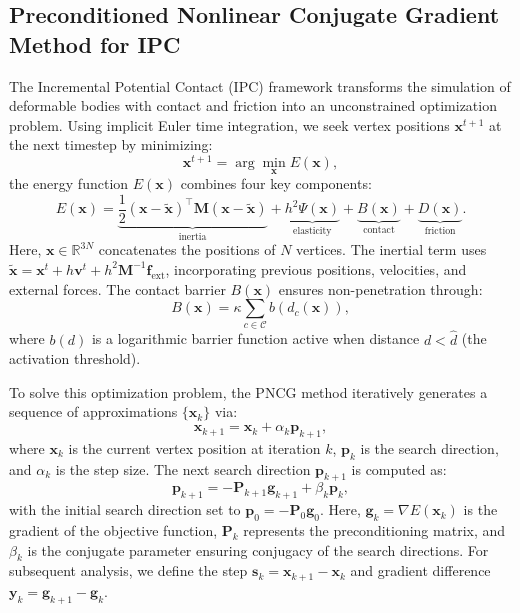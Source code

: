 \documentclass[acmtog,anonymous,review,screen,nonacm]{acmart}
\begin{document}
\subsection{Preconditioned Nonlinear Conjugate Gradient Method for IPC}
\label{sec:pncg_method}
The Incremental Potential Contact (IPC) framework transforms the simulation of deformable bodies with contact and friction into an unconstrained optimization problem. Using implicit Euler time integration, we seek vertex positions $\mathbf{x}^{t+1}$ at the next timestep by minimizing:
\begin{equation}
    \mathbf{x}^{t+1} = \arg \min _{\mathbf{x}} E(\mathbf{x}),
\end{equation}
the energy function $E(\mathbf{x})$ combines four key components:
\begin{equation}
    E(\mathbf{x}) = \underbrace{\frac{1}{2}(\mathbf{x}-\tilde{\mathbf{x}})^{\top} \mathbf{M}(\mathbf{x}-\tilde{\mathbf{x}})}_{\text{inertia}} + \underbrace{h^2 \Psi(\mathbf{x})}_{\text{elasticity}} + \underbrace{B(\mathbf{x})}_{\text{contact}} + \underbrace{D(\mathbf{x})}_{\text{friction}}.
    \label{eq:ipc_energy}
\end{equation}
Here, $\mathbf{x} \in \mathbb{R}^{3N}$ concatenates the positions of $N$ vertices. The inertial term uses $\tilde{\mathbf{x}} = \mathbf{x}^{t} + h\mathbf{v}^{t} + h^2\mathbf{M}^{-1}\mathbf{f}_{\text{ext}}$, incorporating previous positions, velocities, and external forces. The contact barrier $B(\mathbf{x})$ ensures non-penetration through:
\begin{equation}
    B(\mathbf{x}) = \kappa \sum_{c \in \mathcal{C}} b(d_c(\mathbf{x})),
\end{equation}
where $b(d)$ is a logarithmic barrier function active when distance $d < \hat{d}$ (the activation threshold).

To solve this optimization problem, the PNCG method \cite{shen2024preconditioned} iteratively generates a sequence of approximations $\{\mathbf{x}_k\}$ via:
\begin{equation}
    \mathbf{x}_{k+1} = \mathbf{x}_k + \alpha_k \mathbf{p}_{k+1},
\end{equation}
where $\mathbf{x}_k$ is the current vertex position at iteration $k$, $\mathbf{p}_k$ is the search direction, and $\alpha_k$ is the step size. The next search direction $\mathbf{p}_{k+1}$ is computed as:
\begin{equation}
    \mathbf{p}_{k+1} = -\mathbf{P}_{k+1} \mathbf{g}_{k+1} + \beta_k \mathbf{p}_{k},
    \label{eq:pncg_search_direction}
\end{equation}
with the initial search direction set to $\mathbf{p}_0 = -\mathbf{P}_0 \mathbf{g}_0$. Here, $\mathbf{g}_k = \nabla E(\mathbf{x}_k)$ is the gradient of the objective function, $\mathbf{P}_k$ represents the preconditioning matrix, and $\beta_k$ is the conjugate parameter ensuring conjugacy of the search directions. 
For subsequent analysis, we define the step $\mathbf{s}_k = \mathbf{x}_{k+1} - \mathbf{x}_k$ and gradient difference $\mathbf{y}_k = \mathbf{g}_{k+1} - \mathbf{g}_k$.
\vspace{-5pt} 
\end{document}
